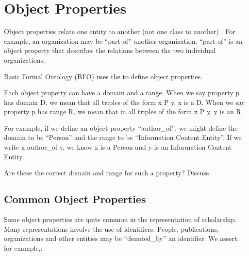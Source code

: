 \documentclass[letterpaper,10pt,english]{sphinxmanual}
\begin{document}
\begin{sphinxShadowBox}

\sphinxAtStartPar
{}
\end{sphinxShadowBox}


\chapter{Object Properties}
\label{\detokenize{object-properties:object-properties}}\label{\detokenize{object-properties::doc}}
\sphinxAtStartPar
Object properties relate one entity to another (not one class to another) .
For example, an organization may be
“part of” another organization.  “part of” is an object property that describes the
relations between the two individual organizations.

\sphinxAtStartPar
Basic Formal Ontology (BFO) uses the
 to define object
properties.

\sphinxAtStartPar
Each object property can have a domain and a range.  When we say property p has domain D,
we mean that all triples of the form x P y, x is a D.  When we say property p has range R,
we mean that in all triples of the form x P y, y is an R.

\sphinxAtStartPar
For example, if we define an object property “author\_of”, we might define the domain to
be “Person” and the range to be “Information Content Entity”. If we write x author\_of y,
we know x is a Person and y is an Information Content Entity. %
\begin{footnote}[1]\sphinxAtStartFootnote
Are these the correct domain and range for such a property? Discuss.
%
\end{footnote}


\section{Common Object Properties}
\label{\detokenize{object-properties:common-object-properties}}
\sphinxAtStartPar
Some object properties are quite common in the representation of scholarship.  Many
representations involve the use of identifiers.  People, publications, organizations
and other entities may be “denoted\_by” an identifier.  We assert, for example,:

\begin{sphinxVerbatim}[commandchars=\\\{\}]
  
  
  
\end{sphinxVerbatim}
\end{document}
